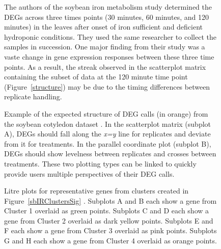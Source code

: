 \documentclass{bmcart}
\begin{document}
\begin{linenumbers}
\begin{backmatter}
\begin{figure}[h!]
\caption{
The authors of the soybean iron metabolism study \cite{Lauter16} determined the DEGs across three times points (30 minutes, 60 minutes, and 120 minutes) in the leaves after onset of iron sufficient and deficient hydroponic conditions. They used the same researcher to collect the samples in succession. One major finding from their study was a vaste change in gene expression responses between these three time points. As a result, the streak observed in the scatterplot matrix containing the subset of data at the 120 minute time point (Figure~\ref{structure}) may be due to the timing differences between replicate handling.
\label{soybeanDEG}}
\end{figure}

\begin{figure}[h!]
\caption{
Example of the expected structure of DEG calls (in orange) from the soybean cotyledon dataset \cite{Brown}. In the scatterplot matrix (subplot A), DEGs should fall along the \textit{x=y} line for replicates and deviate from it for treatments. In the parallel coordinate plot (subplot B), DEGs should show levelness between replicates and crosses between treatments. These two plotting types can be linked to quickly provide users multiple perspectives of their DEG calls.
\label{sbIRDEG}}
\end{figure}

\begin{figure}[h!]
\caption{
Litre plots for representative genes from clusters created in Figure~\ref{sbIRClustersSig} \cite{Lauter16}. Subplots A and B each show a gene from Cluster 1 overlaid as green points. Subplots C and D each show a gene from Cluster 2 overlaid as dark yellow points. Subplots E and F each show a gene from Cluster 3 overlaid as pink points. Subplots G and H each show a gene from Cluster 4 overlaid as orange points.
\label{repDot}}
\end{figure}


\end{backmatter}
\end{linenumbers}
\end{document}
